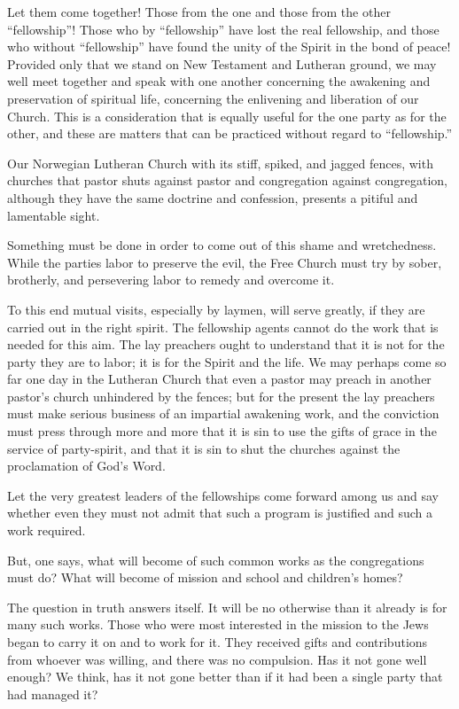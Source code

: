 Let them come together! Those from the one and those from the other “fellowship”! Those who by “fellowship” have lost the real fellowship, and those who without “fellowship” have found the unity of the Spirit in the bond of peace! Provided only that we stand on New Testament and Lutheran ground, we may well meet together and speak with one another concerning the awakening and preservation of spiritual life, concerning the enlivening and liberation of our Church. This is a consideration that is equally useful for the one party as for the other, and these are matters that can be practiced without regard to “fellowship.”

Our Norwegian Lutheran Church with its stiff, spiked, and jagged fences, with churches that pastor shuts against pastor and congregation against congregation, although they have the same doctrine and confession, presents a pitiful and lamentable sight.

Something must be done in order to come out of this shame and wretchedness. While the parties labor to preserve the evil, the Free Church must try by sober, brotherly, and persevering labor to remedy and overcome it.

To this end mutual visits, especially by laymen, will serve greatly, if they are carried out in the right spirit. The fellowship agents cannot do the work that is needed for this aim. The lay preachers ought to understand that it is not for the party they are to labor; it is for the Spirit and the life. We may perhaps come so far one day in the Lutheran Church that even a pastor may preach in another pastor’s church unhindered by the fences; but for the present the lay preachers must make serious business of an impartial awakening work, and the conviction must press through more and more that it is sin to use the gifts of grace in the service of party-spirit, and that it is sin to shut the churches against the proclamation of God’s Word.

Let the very greatest leaders of the fellowships come forward among us and say whether even they must not admit that such a program is justified and such a work required.

But, one says, what will become of such common works as the congregations must do? What will become of mission and school and children’s homes?

The question in truth answers itself. It will be no otherwise than it already is for many such works. Those who were most interested in the mission to the Jews began to carry it on and to work for it. They received gifts and contributions from whoever was willing, and there was no compulsion. Has it not gone well enough? We think, has it not gone better than if it had been a single party that had managed it?

